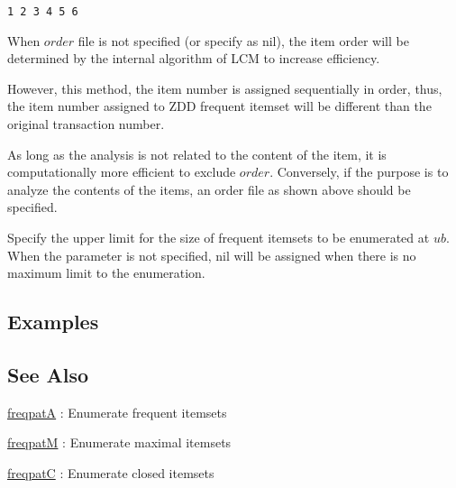 \begin{Verbatim}[baselinestretch=0.7,frame=single]
1 2 3 4 5 6
\end{Verbatim}
When $order$ file is not specified (or specify as nil), the item order will be determined by the internal algorithm of LCM to increase efficiency. 

However, this method, the item number is assigned sequentially in order, thus, the item number assigned to ZDD frequent itemset will be different than the original transaction number. 

As long as the analysis is not related to the content of the item, it is computationally more  efficient to exclude $order$. Conversely, if the purpose is to analyze the contents of the items, an order file as shown above should be specified. 

Specify the upper limit for the size of frequent itemsets to be enumerated at $ub$.  
When the parameter is not specified, nil will be assigned when there is no maximum limit to the enumeration. 

\subsection*{Examples}


\subsection*{See Also}
\hyperref[sect:freqpatA]{freqpatA} : Enumerate frequent itemsets

\hyperref[sect:freqpatM]{freqpatM} : Enumerate maximal itemsets

\hyperref[sect:freqpatC]{freqpatC} : Enumerate closed itemsets


